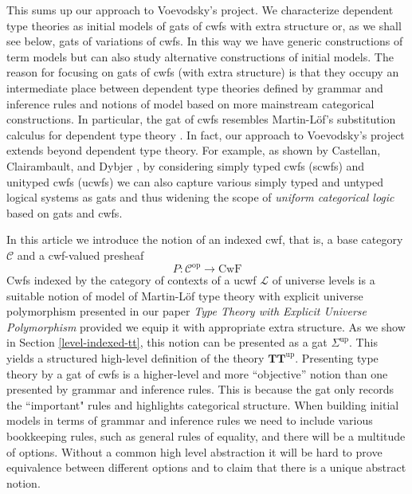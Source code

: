\documentclass[11pt,a4paper]{article}
\theoremstyle{plain}
\theoremstyle{definition}
\newcommand{\op}{\mathrm{op}}
\def\L{{\mathcal{L}}}
\def\CwF{\mathrm{CwF}}
\def\C{\mathcal{C}}
\def\Sigmaext{{\Sigma^\mathrm{ext}}}
\def\Sigmaint{{\Sigma^\mathrm{up}}}
\def\TText{{\mathbf{TT}^\mathrm{ext}}}
\def\TTint{{\mathbf{TT}^\mathrm{up}}}
\begin{document}
This sums up our approach to Voevodsky's project. We characterize dependent type theories as initial models of gats of cwfs with extra structure or, as we shall see below, gats of variations of cwfs. In this way we have generic constructions of term models but can also study alternative constructions of initial models. The reason for focusing on gats of cwfs (with extra structure) is that they occupy an intermediate place between dependent type theories defined by grammar and inference rules and notions of model based on more mainstream categorical constructions. In particular, the gat of cwfs resembles Martin-Löf's substitution calculus for dependent type theory \cite{martinlof:gbg92,tasistro:lic}.
In fact, our approach to Voevodsky's project extends beyond dependent type theory. For example, as shown by Castellan, Clairambault, and Dybjer \cite{castellan:lambek}, by considering simply typed cwfs (scwfs) and unityped cwfs (ucwfs) we can also capture various simply typed and untyped logical systems as gats and thus widening the scope of {\em uniform categorical logic} based on gats and cwfs.

In this article we introduce the notion of an indexed cwf, that is, a base category $\C$ and a cwf-valued presheaf
$$
P : \C^\op \to \CwF
$$
Cwfs indexed by the category of contexts of a ucwf $\L$ of universe levels is a suitable notion of model of Martin-Löf type theory with explicit universe polymorphism presented in our paper {\em Type Theory with Explicit Universe Polymorphism} \cite{BezemCDE22} provided we equip it with appropriate extra structure. As we show in Section \ref{level-indexed-tt}, this notion can be presented as a gat $\Sigmaint$. This yields a structured high-level definition of the theory $\TTint$. Presenting type theory by a gat of cwfs is a higher-level and more ``objective'' notion than one presented by grammar and inference rules. This is because the gat only records the ``important" rules and highlights categorical structure. When building initial models in terms of grammar and inference rules we need to include various bookkeeping rules, such as general rules of equality, and there will be a multitude of options. Without a common high level abstraction it will be hard to prove equivalence between different options and to claim that there is a unique abstract notion.

\end{document}
